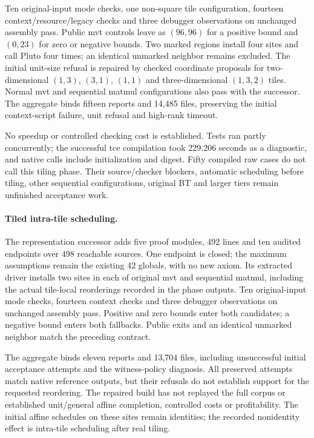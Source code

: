 Ten original-input mode checks, one non-square tile configuration, fourteen
context/resource/legacy checks and three debugger observations on unchanged
assembly pass. Public mvt controls leave as $(96,96)$ for a positive bound and
$(0,23)$ for zero or negative bounds. Two marked regions install four sites
and call Pluto four times; an identical unmarked neighbor remains excluded.
The initial unit-size refusal is repaired by checked coordinate proposals for
two-dimensional $(1,3)$, $(3,1)$, $(1,1)$ and three-dimensional $(1,3,2)$ tiles.
Normal mvt and sequential matmul configurations also pass with the successor.
The aggregate binds fifteen reports and 14,485 files, preserving the initial
context-script failure, unit refusal and high-rank timeout.

No speedup or controlled checking cost is established. Tests ran partly
concurrently; the successful tce compilation took 229.206 seconds as a
diagnostic, and native calls include initialization and digest. Fifty compiled
raw cases do not call this tiling phase. Their source/checker blockers, automatic
scheduling before tiling, other sequential configurations, original BT and
larger tiers remain unfinished acceptance work.

\paragraph{Tiled intra-tile scheduling.}
The representation successor adds five proof modules, 492 lines and ten audited
endpoints over 498 reachable sources. One endpoint is closed; the maximum
assumptions remain the existing 42 globals, with no new axiom. Its extracted
driver installs two sites in each of original mvt and sequential matmul,
including the actual tile-local reorderings recorded in the phase outputs.
Ten original-input mode checks, fourteen context checks and three debugger
observations on unchanged assembly pass. Positive and zero bounds enter both
candidates; a negative bound enters both fallbacks. Public exits and an
identical unmarked neighbor match the preceding contract.

The aggregate binds eleven reports and 13,704 files, including unsuccessful
initial acceptance attempts and the witness-policy diagnosis. All preserved
attempts match native reference outputs, but their refusals do not establish
support for the requested reordering. The repaired build has not replayed the
full corpus or established unit/general affine completion, controlled costs
or profitability. The initial affine schedules on these sites remain identities;
the recorded nonidentity effect is intra-tile scheduling after real tiling.

